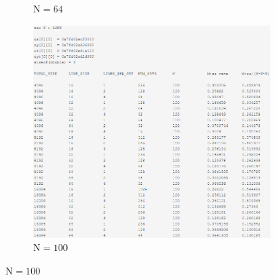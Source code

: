 \documentclass[12pt]{base}
\begin{document}
\begin{figure}[H]
\begin{subfigure}[H]{0.5\linewidth}
    \caption{$\text{N}=64$}
    \label{fig:4_64}
\end{subfigure}\par\bigskip
\begin{subfigure}[H]{0.5\linewidth}
    \centering
    \includegraphics[width=0.75\linewidth]{4_ijkt_100.png}
    \caption{$\text{N}=100$}
    \label{fig:4_100}
\end{subfigure}
\end{figure}
\end{document}
